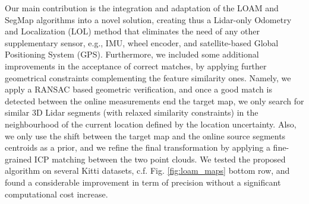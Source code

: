 \documentclass[letterpaper, 10 pt, conference]{ieeeconf}  %
\begin{document}
Our main contribution is the integration and adaptation of the LOAM and SegMap algorithms into a novel solution, creating thus a Lidar-only Odometry and Localization (LOL) method that eliminates the need of any other supplementary sensor, e.g., IMU, wheel encoder, and satellite-based Global Positioning System (GPS). Furthermore, we included some additional improvements in the acceptance of correct matches, by applying further geometrical constraints complementing the feature similarity ones. Namely, we apply a RANSAC based geometric verification, and once a good match is detected between the online measurements end the target map, we only search for similar 3D Lidar segments (with relaxed similarity constraints) in the neighbourhood of the current location defined by the location uncertainty. Also, we only use the shift between the target map and the online source segments centroids as a prior, and we refine the final transformation by applying a fine-grained ICP matching between the two point clouds. We tested the proposed algorithm on several Kitti datasets, c.f. Fig. \ref{fig:loam_maps} bottom row, and found a considerable improvement in term of precision without a significant computational cost increase. 
\end{document}
